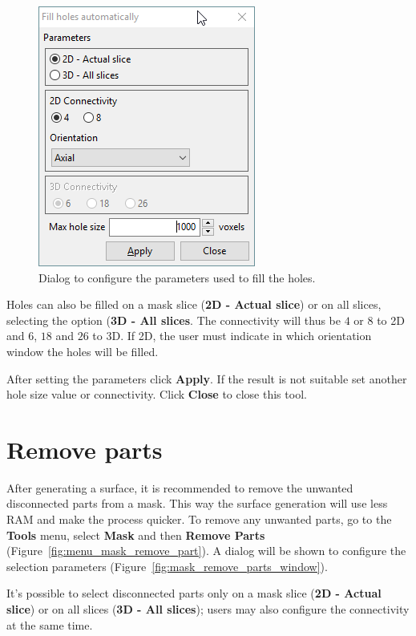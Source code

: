 \begin{figure}[!htb]
\centering
\includegraphics[scale=0.7]{../user_guide_figures/invesalius_screen/mask_automatic_fill_holes_window_en.png}
\caption{Dialog to configure the parameters used to fill the holes.}
\label{fig:mask_automatic_fill_holes_window}
\end{figure}

Holes can also be filled on a mask slice (\textbf{2D - Actual slice}) or on all slices, selecting the option (\textbf{3D - All slices}. The connectivity will thus be $4$ or $8$ to 2D and $6$, $18$ and $26$ to 3D. If 2D, the user must indicate in which orientation window the holes will be filled.

After setting the parameters click \textbf{Apply}. If the result is not suitable set another hole size value or connectivity. Click \textbf{Close} to close this tool.

\section{Remove parts}

After generating a surface, it is recommended to remove the unwanted disconnected parts from a mask. This way the surface generation will use less RAM and make the process quicker. To remove any unwanted parts, go to the \textbf{Tools} menu, select \textbf{Mask} and then \textbf{Remove Parts} (Figure~\ref{fig:menu_mask_remove_part}). A dialog will be shown to configure the selection parameters  (Figure~\ref{fig:mask_remove_parts_window}).

It’s possible to select disconnected parts only on a mask slice (\textbf{2D - Actual slice}) or on all slices (\textbf{3D - All slices}); users may also configure the connectivity at the same time.

